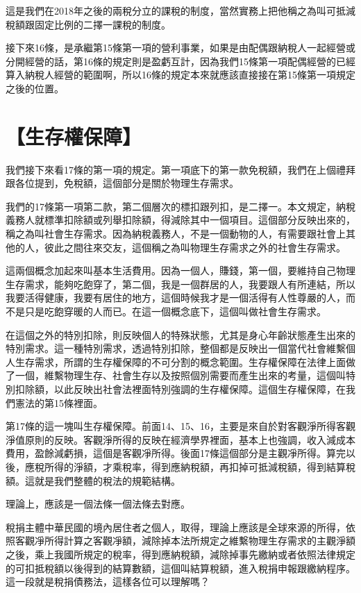 \documentclass[]{ctexbook}
\begin{document}
這是我們在2018年之後的兩稅分立的課稅的制度，當然實務上把他稱之為叫可抵減稅額跟固定比例的二擇一課稅的制度。

接下來16條，是承繼第15條第一項的營利事業，如果是由配偶跟納稅人一起經營或分開經營的話，第16條的規定則是盈虧互計，因為我們15條第一項配偶經營的已經算入納稅人經營的範圍啊，所以16條的規定本來就應該直接接在第15條第一項規定之後的位置。

\hypertarget{ux751fux5b58ux6b0aux4fddux969c}{%
\section{【生存權保障】}\label{ux751fux5b58ux6b0aux4fddux969c}}

我們接下來看17條的第一項的規定。第一項底下的第一款免稅額，我們在上個禮拜跟各位提到，免稅額，這個部分是關於物理生存需求。

我們的17條第一項第二款，第二個層次的標扣跟列扣，是二擇一。本文規定，納稅義務人就標準扣除額或列舉扣除額，得減除其中一個項目。這個部分反映出來的，稱之為叫社會生存需求。因為納稅義務人，不是一個動物的人，有需要跟社會上其他的人，彼此之間往來交友，這個稱之為叫物理生存需求之外的社會生存需求。

這兩個概念加起來叫基本生活費用。因為一個人，賺錢，第一個，要維持自己物理生存需求，能夠吃飽穿了，第二個，我是一個群居的人，我要跟人有所連結，所以我要活得健康，我要有居住的地方，這個時候我才是一個活得有人性尊嚴的人，而不是只是吃飽穿暖的人而已。在這一個概念底下，這個叫做社會生存需求。

在這個之外的特別扣除，則反映個人的特殊狀態，尤其是身心年齡狀態產生出來的特別需求。這一種特別需求，透過特別扣除，整個都是反映出一個當代社會維繫個人生存需求，所謂的生存權保障的不可分割的概念範圍。生存權保障在法律上面做了一個，維繫物理生存、社會生存以及按照個別需要而產生出來的考量，這個叫特別扣除額，以此反映出社會法裡面特別強調的生存權保障。這個生存權保障，在我們憲法的第15條裡面。

第17條的這一塊叫生存權保障。前面14、15、16，主要是來自於對客觀淨所得客觀淨值原則的反映。客觀淨所得的反映在經濟學界裡面，基本上也強調，收入減成本費用，盈餘減虧損，這個是客觀凈所得。後面17條這個部分是主觀凈所得。算完以後，應稅所得的淨額，才乘稅率，得到應納稅額，再扣掉可抵減稅額，得到結算稅額。這就是我們整體的稅法的規範結構。

理論上，應該是一個法條一個法條去對應。

稅捐主體中華民國的境內居住者之個人，取得，理論上應該是全球來源的所得，依照客觀凈所得計算之客觀凈額，減除掉本法所規定之維繫物理生存需求的主觀淨額之後，乘上我國所規定的稅率，得到應納稅額，減除掉事先繳納或者依照法律規定的可扣抵稅額以後得到的結算數額，這個叫結算稅額，進入稅捐申報跟繳納程序。這一段就是稅捐債務法，這樣各位可以理解嗎？
\end{document}
